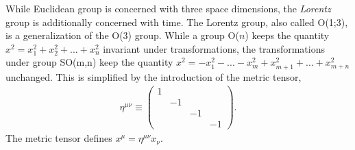 While Euclidean group is concerned with three space dimensions, the \emph{Lorentz} group is additionally concerned with time.
The Lorentz group, also called O(1;3), is a generalization of the O(3) group. 
While a group O($n$) keeps the quantity $x^2=x_1^2+x_2^2+...+x_{n}^2$ invariant under transformations, the transformations under group SO(m,n) keep the quantity \mbox{$x^2=-x_1^2-...-x_{m}^2+x_{m+1}^2+...+x_{m+n}^2$} unchanged.
This is simplified by the introduction of the metric tensor,
\begin{equation}\begin{split}\label{eqn:metric}
    \eta^{\mu\nu}\equiv\begin{pmatrix}1&&&\\&-1&&\\&&-1&\\&&&-1\end{pmatrix}.
\end{split}\end{equation}
The metric tensor defines $x^\mu=\eta^{\mu\nu}x_\nu$.

